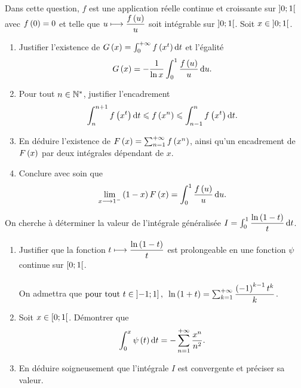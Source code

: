 \begin{q}
Dans cette question, \(f\) est une application réelle continue et croissante sur \(\left]0;1\right[\) avec \(f\left(0\right)=0\) et telle que \(u\longmapsto\dfrac{f\left(u\right)}{u}\) soit intégrable sur \(\left]0;1\right[\). Soit \(x\in\left]0;1\right[\).

\begin{enumerate}
    \item Justifier l'existence de \(G\paren{x}=\int_0^{\pinf}f\paren{x^t}\odif{t}\) et l'égalité \[G\paren{x}=-\dfrac{1}{\ln x}\int_0^1\dfrac{f\paren{u}}{u}\odif{u}.\]
    \item Pour tout \(n\in\mathbb{N}^*\), justifier l'encadrement \[\int_n^{n+1}f\paren{x^t}\odif{t}\leq f\paren{x^n}\leq\int_{n-1}^nf\paren{x^t}\odif{t}.\]
    \item En déduire l'existence de \(F\left(x\right)=\sum_{n=1}^{+\infty}f\left(x^n\right)\), ainsi qu'un encadrement de \(F\left(x\right)\) par deux intégrales dépendant de \(x\). \\
    \item Conclure avec soin que \[\lim_{x\to1^-}\paren{1-x}F\paren{x}=\int_0^1\dfrac{f\paren{u}}{u}\odif{u}.\]
\end{enumerate}
\end{q}

\begin{q}
On cherche à déterminer la valeur de l'intégrale généralisée \(I=\int_0^1\dfrac{\ln\paren{1-t}}{t}\odif{t}\).

\begin{enumerate}
    \item Justifier que la fonction \(t\longmapsto\dfrac{\ln\left(1-t\right)}{t}\) est prolongeable en une fonction \(\psi\) continue sur \(\left[0;1\right[\). \\\\ On admettra que \(\quantifs{\tpt t\in\intervei{-1}{1}}\ln\paren{1+t}=\sum_{k=1}^{\pinf}\dfrac{\paren{-1}^{k-1}t^k}{k}\). \\
    \item Soit \(x\in\left[0;1\right[\). Démontrer que \[\int_0^x\psi\paren{t}\odif{t}=-\sum_{n=1}^{\pinf}\dfrac{x^n}{n^2}.\]
    \item En déduire soigneusement que l'intégrale \(I\) est convergente et préciser sa valeur.
\end{enumerate}
\end{q}

